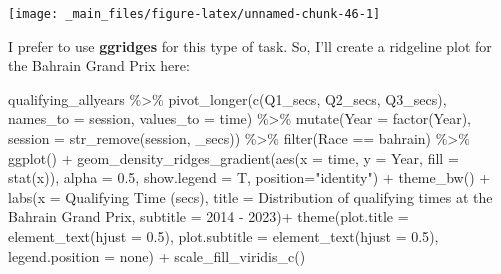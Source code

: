\documentclass[
]{book}
\newenvironment{Shaded}{\begin{snugshade}}{\end{snugshade}}
\newcommand{\AttributeTok}[1]{\textcolor[rgb]{0.77,0.63,0.00}{#1}}
\newcommand{\FloatTok}[1]{\textcolor[rgb]{0.00,0.00,0.81}{#1}}
\newcommand{\FunctionTok}[1]{\textcolor[rgb]{0.00,0.00,0.00}{#1}}
\newcommand{\NormalTok}[1]{#1}
\newcommand{\SpecialCharTok}[1]{\textcolor[rgb]{0.00,0.00,0.00}{#1}}
\newcommand{\StringTok}[1]{\textcolor[rgb]{0.31,0.60,0.02}{#1}}
\begin{document}
\begin{center}\texttt{[image: \_main\_files/figure-latex/unnamed-chunk-46-1]} \end{center}

I prefer to use \textbf{ggridges} for this type of task. So, I'll create a ridgeline plot for the Bahrain Grand Prix here:

\begin{Shaded}
\begin{Highlighting}[]
\NormalTok{qualifying\_allyears }\SpecialCharTok{\%\textgreater{}\%}
  \FunctionTok{pivot\_longer}\NormalTok{(}\FunctionTok{c}\NormalTok{(}\StringTok{\textquotesingle{}Q1\_secs\textquotesingle{}}\NormalTok{, }\StringTok{\textquotesingle{}Q2\_secs\textquotesingle{}}\NormalTok{, }\StringTok{\textquotesingle{}Q3\_secs\textquotesingle{}}\NormalTok{),}
               \AttributeTok{names\_to =} \StringTok{\textquotesingle{}session\textquotesingle{}}\NormalTok{,}
               \AttributeTok{values\_to =} \StringTok{\textquotesingle{}time\textquotesingle{}}\NormalTok{) }\SpecialCharTok{\%\textgreater{}\%}
  \FunctionTok{mutate}\NormalTok{(}\AttributeTok{Year =} \FunctionTok{factor}\NormalTok{(Year),}
         \AttributeTok{session =} \FunctionTok{str\_remove}\NormalTok{(session, }\StringTok{\textquotesingle{}\_secs\textquotesingle{}}\NormalTok{)) }\SpecialCharTok{\%\textgreater{}\%}
  \FunctionTok{filter}\NormalTok{(Race }\SpecialCharTok{==} \StringTok{\textquotesingle{}bahrain\textquotesingle{}}\NormalTok{) }\SpecialCharTok{\%\textgreater{}\%}
  \FunctionTok{ggplot}\NormalTok{() }\SpecialCharTok{+}
  \FunctionTok{geom\_density\_ridges\_gradient}\NormalTok{(}\FunctionTok{aes}\NormalTok{(}\AttributeTok{x =}\NormalTok{ time, }\AttributeTok{y =}\NormalTok{ Year, }\AttributeTok{fill =} \FunctionTok{stat}\NormalTok{(x)),}
                 \AttributeTok{alpha =} \FloatTok{0.5}\NormalTok{, }\AttributeTok{show.legend =}\NormalTok{ T,}
                 \AttributeTok{position=}\StringTok{"identity"}\NormalTok{) }\SpecialCharTok{+}
  \FunctionTok{theme\_bw}\NormalTok{() }\SpecialCharTok{+}
  \FunctionTok{labs}\NormalTok{(}\AttributeTok{x =} \StringTok{\textquotesingle{}Qualifying Time (secs)\textquotesingle{}}\NormalTok{,}
       \AttributeTok{title =} \StringTok{\textquotesingle{}Distribution of qualifying times at the Bahrain Grand Prix\textquotesingle{}}\NormalTok{,}
       \AttributeTok{subtitle =} \StringTok{\textquotesingle{}2014 {-} 2023\textquotesingle{}}\NormalTok{)}\SpecialCharTok{+}
  \FunctionTok{theme}\NormalTok{(}\AttributeTok{plot.title =} \FunctionTok{element\_text}\NormalTok{(}\AttributeTok{hjust =} \FloatTok{0.5}\NormalTok{),}
        \AttributeTok{plot.subtitle =} \FunctionTok{element\_text}\NormalTok{(}\AttributeTok{hjust =} \FloatTok{0.5}\NormalTok{),}
        \AttributeTok{legend.position =} \StringTok{\textquotesingle{}none\textquotesingle{}}\NormalTok{) }\SpecialCharTok{+}
  \FunctionTok{scale\_fill\_viridis\_c}\NormalTok{()}
\end{Highlighting}
\end{Shaded}
\end{document}
